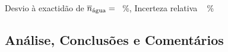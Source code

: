 \documentclass[a4paper,12pt]{article}  %
\begin{document}
\noindent Desvio à exactidão de $\overline{n}_{\textup{água}} =$~\underline{\makebox[1cm][r]{~}} \%, 
 Incerteza relativa ~\underline{\makebox[1cm][r]{~}} \%




\subsection{\sf Análise, Conclusões e Comentários}
\noindent\underline{\makebox[\textwidth][r]{~}} \\
\noindent\underline{\makebox[\textwidth][r]{~}} \\
\noindent\underline{\makebox[\textwidth][r]{~}} \\
\noindent\underline{\makebox[\textwidth][r]{~}} \\
\noindent\underline{\makebox[\textwidth][r]{~}} \\
\noindent\underline{\makebox[\textwidth][r]{~}} \\
\noindent\underline{\makebox[\textwidth][r]{~}} \\
\noindent\underline{\makebox[\textwidth][r]{~}} \\
\noindent\underline{\makebox[\textwidth][r]{~}} \\
\noindent\underline{\makebox[\textwidth][r]{~}} \\
\noindent\underline{\makebox[\textwidth][r]{~}} \\
\noindent\underline{\makebox[\textwidth][r]{~}} \\
\noindent\underline{\makebox[\textwidth][r]{~}} \\
\noindent\underline{\makebox[\textwidth][r]{~}} \\
\noindent\underline{\makebox[\textwidth][r]{~}} \\




\end{document}
